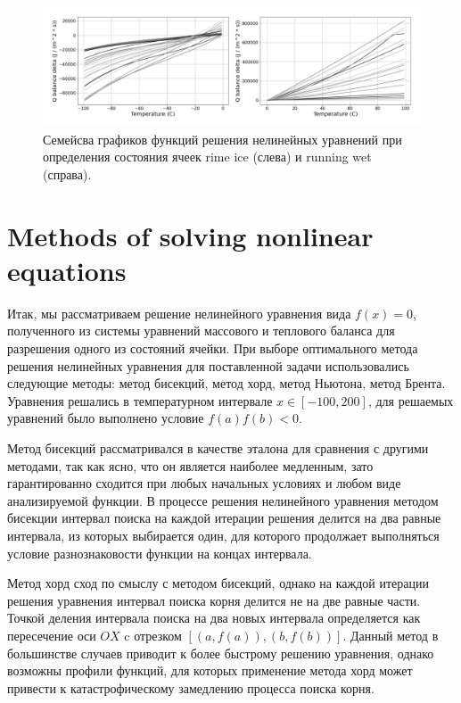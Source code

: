 \documentclass[
11pt,%
tightenlines,%
twoside,%
onecolumn,%
nofloats,%
nobibnotes,%
nofootinbib,%
superscriptaddress,%
noshowpacs,%
centertags]%
{revtex4}
\begin{document}
\begin{figure}[h]
\setcaptionmargin{5mm}
\onelinecaptionstrue
\includegraphics[width=1.0\textwidth]{pics/dq_rime_wet.pdf}
\caption{Семейсва графиков функций решения нелинейных уравнений при определения состояния ячеек rime ice (слева) и running wet (справа).}\label{fig:dq_rime_wet}
\end{figure}

\section{Methods of solving nonlinear equations}

Итак, мы рассматриваем решение нелинейного уравнения вида $f(x) = 0$, полученного из системы уравнений массового и теплового баланса для разрешения одного из состояний ячейки.
При выборе оптимального метода решения нелинейных уравнения для поставленной задачи использовались следующие методы: метод бисекций, метод хорд, метод Ньютона, метод Брента.
Уравнения решались в температурном интервале $x \in [-100, 200]$, для решаемых уравнений было выполнено условие $f(a) f(b) < 0$.

Метод бисекций рассматривался в качестве эталона для сравнения с другими методами, так как ясно, что он является наиболее медленным, зато гарантированно сходится при любых начальных условиях и любом виде анализируемой функции.
В процессе решения нелинейного уравнения методом бисекции интервал поиска на каждой итерации решения делится на два равные интервала, из которых выбирается один, для которого продолжает выполняться условие разнознаковости функции на концах интервала.

Метод хорд сход по смыслу с методом бисекций, однако на каждой итерации решения уравнения интервал поиска корня делится не на две равные части.
Точкой деления интервала поиска на два новых интервала определяется как пересечение оси $OX$ c отрезком $[(a, f(a)), (b, f(b))]$.
Данный метод в большинстве случаев приводит к более быстрому решению уравнения, однако возможны профили функций, для которых применение метода хорд может привести к катастрофическому замедлению процесса поиска корня.
\end{document}
